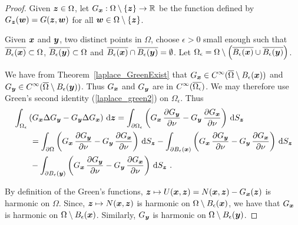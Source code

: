 \begin{proof}
Given ${\bm{z}} \in \Omega$, let
$G_{{\bm{x}}}:\Omega \setminus \{{\bm{z}}\} \to \mathbb{R}$
be the function defined by $G_{{\bm{z}}}({\bm{w}}) = G({\bm{z}},{\bm{w}})$
for all ${\bm{w}} \in \Omega \setminus \{{\bm{z}}\}$.

Given ${\bm{x}}$ and ${\bm{y}}$, two distinct points in $\Omega$,
choose $\epsilon >0$ small enough such that
$\overline{B_{\epsilon}({\bm{x}})} \subset \Omega$,
$\overline{B_{\epsilon}({\bm{y}})} \subset \Omega$ and
$\overline{B_{\epsilon}({\bm{x}})} \cap
\overline{B_{\epsilon}({\bm{y}})} = \emptyset$.
Let $\Omega_\epsilon = \Omega \setminus
\left(\overline{B_{\epsilon}({\bm{x}})} \cup
\overline{B_{\epsilon}({\bm{y}})} \right)$.

We have from Theorem~\ref{laplace_GreenExist} that
$\displaystyle G_{{\bm{x}}} \in
C^\infty(\overline{\Omega}\setminus B_{\epsilon}({\bm{x}}))$ and
$\displaystyle G_{{\bm{y}}} \in
C^\infty(\overline{\Omega}\setminus B_{\epsilon}({\bm{y}}))$.
Thus $G_{{\bm{x}}}$ and $G_{{\bm{y}}}$ are in
$\displaystyle C^\infty(\overline{\Omega_{\epsilon}})$.  We may therefore use
Green's second identity (\ref{laplace_green2}) on $\Omega_{\epsilon}$.
Thus
\begin{equation} \label{laplace_GequG}
\begin{split}
&\int_{\Omega_{\epsilon}} \left( G_{{\bm{x}}} \Delta G_{{\bm{y}}} - G_{{\bm{y}}}
\Delta G_{{\bm{x}}} \right) \,\mathrm{d}{{\bm{z}}}
= \int_{\partial \Omega_{\epsilon}} \left( G_{{\bm{x}}}\,\frac{\partial{G_{{\bm{y}}}}}{\partial \nu} 
- G_{{\bm{y}}}\,\frac{\partial{G_{{\bm{x}}}}}{\partial \nu} \right) \,\mathrm{d}{S}_{{\bm{z}}} \\
& \qquad = \int_{\partial \Omega} \left( G_{{\bm{x}}}\,\frac{\partial{G_{{\bm{y}}}}}{\partial \nu} 
- G_{{\bm{y}}}\,\frac{\partial{G_{{\bm{x}}}}}{\partial \nu} \right) \,\mathrm{d}{S}_{{\bm{z}}}
- \int_{\partial B_{\epsilon}({\bm{x}})}
\left( G_{{\bm{x}}}\,\frac{\partial{G_{{\bm{y}}}}}{\partial \nu} 
- G_{{\bm{y}}}\,\frac{\partial{G_{{\bm{x}}}}}{\partial \nu} \right) \,\mathrm{d}{S}_{{\bm{z}}} \\
& \qquad - \int_{\partial B_{\epsilon}({\bm{y}})}
\left( G_{{\bm{x}}}\,\frac{\partial{G_{{\bm{y}}}}}{\partial \nu} 
- G_{{\bm{y}}}\,\frac{\partial{G_{{\bm{x}}}}}{\partial \nu} \right) \,\mathrm{d}{S}_{{\bm{z}}} \ .
\end{split}
\end{equation}

By definition of the Green's functions,
${\bm{z}} \mapsto U({\bm{x}},{\bm{z}})
= N({\bm{x}},{\bm{z}}) - G_{{\bm{x}}}({\bm{z}})$
is harmonic on $\Omega$.
Since, ${\bm{z}} \mapsto N({\bm{x}},{\bm{z}})$ is harmonic on
$\Omega \setminus B_{\epsilon}({\bm{x}})$, we have that
$G_{{\bm{x}}}$ is harmonic on $\Omega \setminus B_{\epsilon}({\bm{x}})$.
Similarly, $G_{{\bm{y}}}$ is harmonic on
$\Omega \setminus B_{\epsilon}({\bm{y}})$.


\end{proof}
